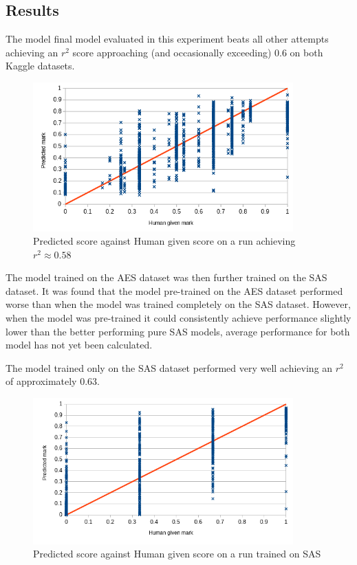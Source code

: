 \documentclass[11pt]{article}
\begin{document}
\subsection{Results}
\label{sec:orgce74f69}
The model final model evaluated in this experiment beats all other attempts achieving an \(r^2\) score approaching (and occasionally exceeding) \(0.6\) on both Kaggle datasets.

\begin{figure}[htbp]
\centering
\includegraphics[width=10cm]{./exp5_aes_dist.png}
\caption{Predicted score against Human given score on a run achieving \(r^2 \approx 0.58\)}
\end{figure}

The model trained on the AES dataset was then further trained on the SAS dataset. It was found that the model pre-trained on the AES dataset performed worse than when the model was trained completely on the SAS dataset. However, when the model was pre-trained it could consistently achieve performance slightly lower than the better performing pure SAS models, average performance for both model has not yet been calculated.

The model trained only on the SAS dataset performed very well achieving an \(r^2\) of approximately 0.63.

\begin{figure}[htbp]
\centering
\includegraphics[width=10cm]{./exp5_sas_dist.png}
\caption{Predicted score against Human given score on a run trained on SAS}
\end{figure}
\end{document}
